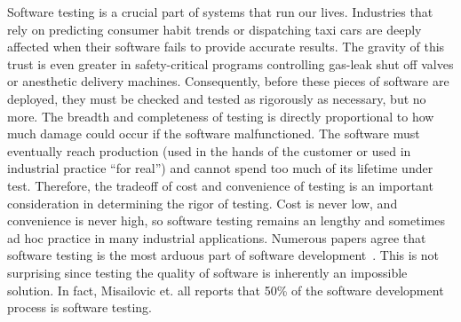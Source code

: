 
Software testing is a crucial part of systems that run our lives. Industries that rely on predicting consumer habit trends or dispatching taxi cars are deeply affected when their software fails to provide accurate results. The gravity of this trust is even greater in safety-critical programs controlling gas-leak shut off valves or anesthetic delivery machines. Consequently, before these pieces of software are deployed, they must be checked and tested as rigorously as necessary, but no more. The breadth and completeness of testing is directly proportional to how much damage could occur if the software malfunctioned. The software must eventually reach production (used in the hands of the customer or used in industrial practice ``for real'') and cannot spend too much of its lifetime under test. Therefore, the tradeoff of cost and convenience of testing is an important consideration in determining the rigor of testing. Cost is never low, and convenience is never high, so software testing remains an lengthy and sometimes ad hoc practice in many industrial applications. Numerous papers agree that software testing is the most arduous part of software development~\cite{Murphy:2007:PRT:1292414.1292425,Haller:2010:TDC:1838126.1838132,Muslu:2015:PDE:2771783.2771792,Tiwari:2013:RRT:2439976.2439982,Gupta:2011:MBA:2002931.2002932,Zeller:2017:STS:3105427.3105438,Garousi:2017:IWA:3084226.3084264,Kassab-deFranco-Laplante}. This is not surprising since testing the quality of software is inherently an impossible solution. In fact, Misailovic et. all reports that 50\% of the software development process is software testing.

